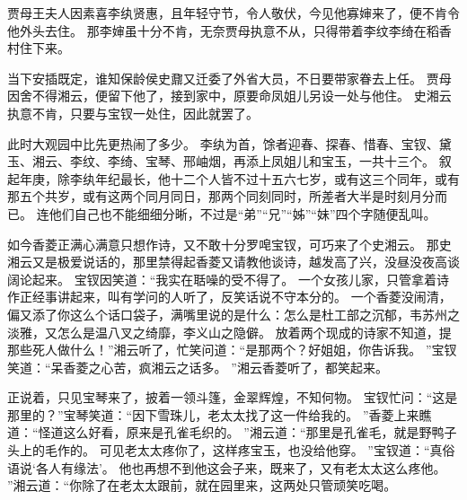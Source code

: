 贾母王夫人因素喜李纨贤惠，且年轻守节，令人敬伏，今见他寡婶来了，便不肯令他外头去住。
那李婶虽十分不肯，无奈贾母执意不从，只得带着李纹李绮在稻香村住下来。
\par
当下安插既定，谁知保龄侯史鼐又迁委了外省大员，不日要带家眷去上任。
贾母因舍不得湘云，便留下他了，接到家中，原要命凤姐儿另设一处与他住。
史湘云执意不肯，只要与宝钗一处住，因此就罢了。
\par
此时大观园中比先更热闹了多少。
李纨为首，馀者迎春、探春、惜春、宝钗、黛玉、湘云、李纹、李绮、宝琴、邢岫烟，再添上凤姐儿和宝玉，一共十三个。
叙起年庚，除李纨年纪最长，他十二个人皆不过十五六七岁，或有这三个同年，或有那五个共岁，或有这两个同月同日，那两个同刻同时，所差者大半是时刻月分而已。
连他们自己也不能细细分晰，不过是“弟”“兄”“姊”“妹”四个字随便乱叫。
\par
如今香菱正满心满意只想作诗，又不敢十分罗唣宝钗，可巧来了个史湘云。
那史湘云又是极爱说话的，那里禁得起香菱又请教他谈诗，越发高了兴，没昼没夜高谈阔论起来。
宝钗因笑道：“我实在聒噪的受不得了。
一个女孩儿家，只管拿着诗作正经事讲起来，叫有学问的人听了，反笑话说不守本分的。
一个香菱没闹清，偏又添了你这么个话口袋子，满嘴里说的是什么：怎么是杜工部之沉郁，韦苏州之淡雅，又怎么是温八叉之绮靡，李义山之隐僻。
放着两个现成的诗家不知道，提那些死人做什么！”湘云听了，忙笑问道：“是那两个？好姐姐，你告诉我。
”宝钗笑道：“呆香菱之心苦，疯湘云之话多。
”湘云香菱听了，都笑起来。
\par
正说着，只见宝琴来了，披着一领斗篷，金翠辉煌，不知何物。
宝钗忙问：“这是那里的？”宝琴笑道：“因下雪珠儿，老太太找了这一件给我的。
”香菱上来瞧道：“怪道这么好看，原来是孔雀毛织的。
”湘云道：“那里是孔雀毛，就是野鸭子头上的毛作的。
可见老太太疼你了，这样疼宝玉，也没给他穿。
”宝钗道：“真俗语说‘各人有缘法’。
他也再想不到他这会子来，既来了，又有老太太这么疼他。
”湘云道：“你除了在老太太跟前，就在园里来，这两处只管顽笑吃喝。

